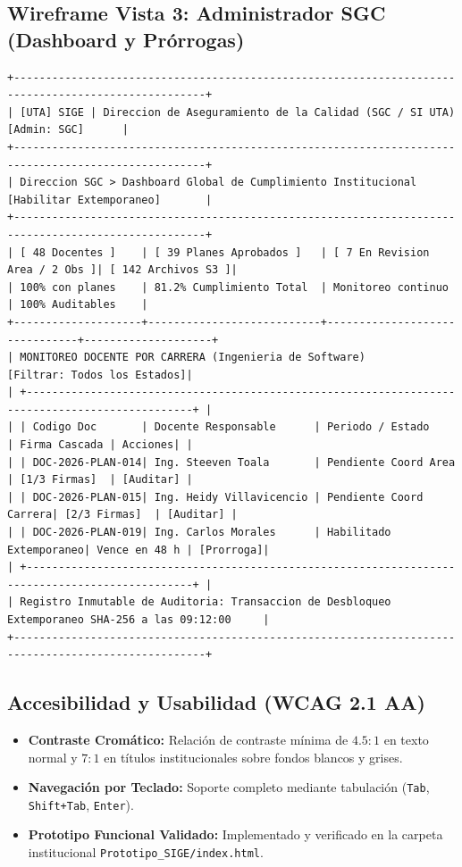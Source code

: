 \documentclass[12pt,a4paper]{article}
\begin{document}
\subsection{Wireframe Vista 3: Administrador SGC (Dashboard y Prórrogas)}
\begin{lstlisting}
+----------------------------------------------------------------------------------------------------+
| [UTA] SIGE | Direccion de Aseguramiento de la Calidad (SGC / SI UTA)             [Admin: SGC]      |
+----------------------------------------------------------------------------------------------------+
| Direccion SGC > Dashboard Global de Cumplimiento Institucional       [Habilitar Extemporaneo]       |
+----------------------------------------------------------------------------------------------------+
| [ 48 Docentes ]    | [ 39 Planes Aprobados ]   | [ 7 En Revision Area / 2 Obs ]| [ 142 Archivos S3 ]|
| 100% con planes    | 81.2% Cumplimiento Total  | Monitoreo continuo            | 100% Auditables    |
+--------------------+---------------------------+-------------------------------+--------------------+
| MONITOREO DOCENTE POR CARRERA (Ingenieria de Software)                  [Filtrar: Todos los Estados]|
| +------------------------------------------------------------------------------------------------+ |
| | Codigo Doc       | Docente Responsable      | Periodo / Estado       | Firma Cascada | Acciones| |
| | DOC-2026-PLAN-014| Ing. Steeven Toala       | Pendiente Coord Area   | [1/3 Firmas]  | [Auditar] |
| | DOC-2026-PLAN-015| Ing. Heidy Villavicencio | Pendiente Coord Carrera| [2/3 Firmas]  | [Auditar] |
| | DOC-2026-PLAN-019| Ing. Carlos Morales      | Habilitado Extemporaneo| Vence en 48 h | [Prorroga]|
| +------------------------------------------------------------------------------------------------+ |
| Registro Inmutable de Auditoria: Transaccion de Desbloqueo Extemporaneo SHA-256 a las 09:12:00     |
+----------------------------------------------------------------------------------------------------+
\end{lstlisting}

\subsection{Accesibilidad y Usabilidad (WCAG 2.1 AA)}
\begin{itemize}[leftmargin=1.5em, itemsep=2pt]
    \item \textbf{Contraste Cromático:} Relación de contraste mínima de $4.5:1$ en texto normal y $7:1$ en títulos institucionales sobre fondos blancos y grises.
    \item \textbf{Navegación por Teclado:} Soporte completo mediante tabulación (\texttt{Tab}, \texttt{Shift+Tab}, \texttt{Enter}).
    \item \textbf{Prototipo Funcional Validado:} Implementado y verificado en la carpeta institucional \texttt{Prototipo\_SIGE/index.html}.
\end{itemize}
\end{document}
